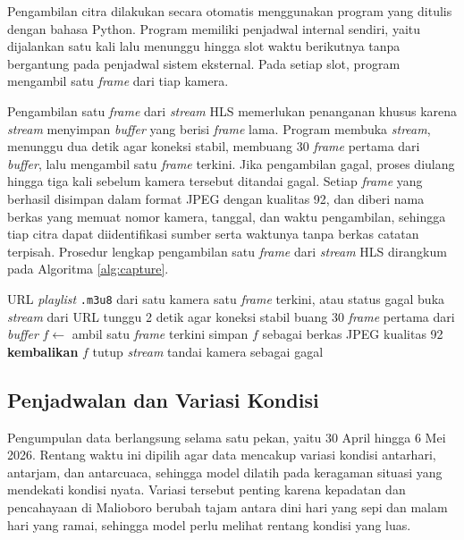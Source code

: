Pengambilan citra dilakukan secara otomatis menggunakan program yang ditulis dengan 
bahasa Python. Program memiliki penjadwal internal sendiri, yaitu dijalankan satu kali 
lalu menunggu hingga slot waktu berikutnya tanpa bergantung pada penjadwal sistem 
eksternal. Pada setiap slot, program mengambil satu \textit{frame} dari tiap kamera.

Pengambilan satu \textit{frame} dari \textit{stream} HLS memerlukan penanganan khusus karena 
\textit{stream} menyimpan \textit{buffer} yang berisi \textit{frame} lama. Program membuka 
\textit{stream}, menunggu dua detik agar koneksi stabil, membuang 30 \textit{frame} pertama 
dari \textit{buffer}, lalu mengambil satu \textit{frame} terkini. Jika pengambilan 
gagal, proses diulang hingga tiga kali sebelum kamera tersebut ditandai gagal. Setiap 
\textit{frame} yang berhasil disimpan dalam format JPEG dengan kualitas 92, dan diberi 
nama berkas yang memuat nomor kamera, tanggal, dan waktu pengambilan, sehingga tiap 
citra dapat diidentifikasi sumber serta waktunya tanpa berkas catatan terpisah. Prosedur 
lengkap pengambilan satu \textit{frame} dari \textit{stream} HLS dirangkum pada Algoritma 
\ref{alg:capture}.

\begin{algorithm}[h]
    \caption{Pengambilan satu \textit{frame} terkini dari \textit{stream} HLS.}
    \label{alg:capture}
    \begin{algorithmic}[1]
        \Require URL \textit{playlist} \texttt{.m3u8} dari satu kamera
        \Ensure satu \textit{frame} terkini, atau status gagal
            \State buka \textit{stream} dari URL
            \State tunggu 2 detik agar koneksi stabil
            \State buang 30 \textit{frame} pertama dari \textit{buffer}
            \State $f \gets$ ambil satu \textit{frame} terkini
                \State simpan $f$ sebagai berkas JPEG kualitas 92
                \State \textbf{kembalikan} $f$
            \EndIf
            \State tutup \textit{stream}
        \EndFor
        \State tandai kamera sebagai gagal
    \end{algorithmic}
\end{algorithm}

\subsection{Penjadwalan dan Variasi Kondisi}

Pengumpulan data berlangsung selama satu pekan, yaitu 30 April hingga 6 Mei 2026. Rentang 
waktu ini dipilih agar data mencakup variasi kondisi antarhari, antarjam, dan antarcuaca, 
sehingga model dilatih pada keragaman situasi yang mendekati kondisi nyata. Variasi tersebut 
penting karena kepadatan dan pencahayaan di Malioboro berubah tajam antara dini hari yang 
sepi dan malam hari yang ramai, sehingga model perlu melihat rentang kondisi yang luas.

